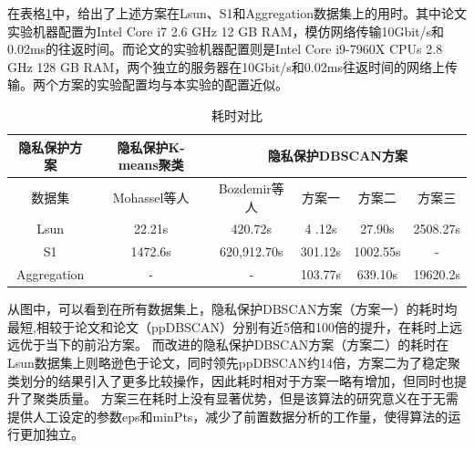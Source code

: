 在表格\ref{s4-table-runtime}中，给出了上述方案在Lsun、S1和Aggregation数据集上的用时。其中论文\cite{mohassel2019practical}实验机器配置为Intel Core i7 2.6 GHz 12 GB RAM，模仿网络传输10Gbit/s和0.02ms的往返时间。而论文\cite{bozdemir2021privacy}的实验机器配置则是Intel Core i9-7960X CPUs 2.8 GHz 128 GB RAM，两个独立的服务器在10Gbit/s和0.02ms往返时间的网络上传输。两个方案的实验配置均与本实验的配置近似。

\begin{table}[!htbp]
	\centering
	\renewcommand{\arraystretch}{1.3}
	\caption{耗时对比}
	\label{s4-table-runtime}
	\begin{tabular}{c|c|c|c|c|c}
		\hline
		隐私保护方案 & 隐私保护K-means聚类                      & \multicolumn{4}{c}{隐私保护DBSCAN方案}                                 \\
		\hline
		数据集       & Mohassel等人\cite{mohassel2019practical} & Bozdemir等人\cite{bozdemir2021privacy} & 方案一  & 方案二   & 方案三   \\
		\hline
		Lsun         & 22.21s                                   & 420.72s                                & 4 .12s  & 27.90s   & 2508.27s \\
		\hline
		S1           & 1472.6s                                  & 620,912.70s                            & 301.12s & 1002.55s & -        \\
		\hline
		Aggregation  & -                                        & -                                      & 103.77s & 639.10s  & 19620.2s \\
		\hline
	\end{tabular}
\end{table}

从图中，可以看到在所有数据集上，隐私保护DBSCAN方案（方案一）的耗时均最短,相较于论文\cite{mohassel2019practical}和论文\cite{bozdemir2021privacy}（ppDBSCAN）分别有近5倍和100倍的提升，在耗时上远远优于当下的前沿方案。
而改进的隐私保护DBSCAN方案（方案二）的耗时在Lsun数据集上则略逊色于论文\cite{mohassel2019practical}，同时领先ppDBSCAN约14倍，方案二为了稳定聚类划分的结果引入了更多比较操作，因此耗时相对于方案一略有增加，但同时也提升了聚类质量。
方案三在耗时上没有显著优势，但是该算法的研究意义在于无需提供人工设定的参数eps和minPts，减少了前置数据分析的工作量，使得算法的运行更加独立。

